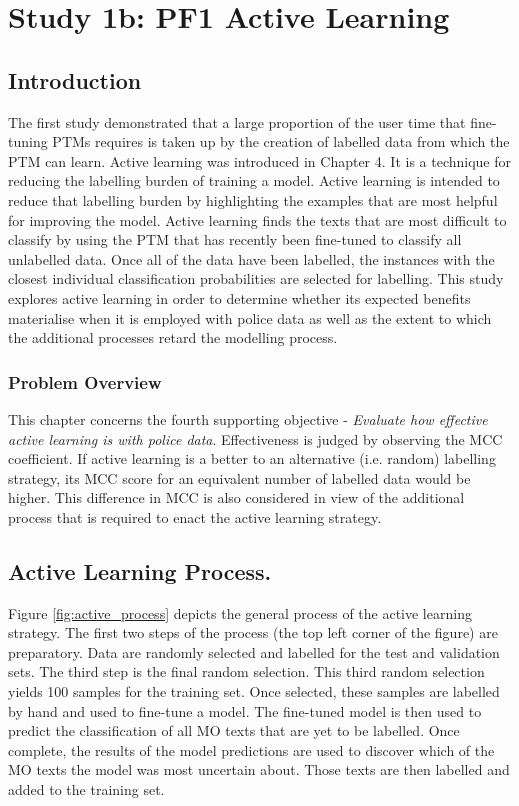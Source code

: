 \chapter{Study 1b: PF1 Active Learning}


\section{Introduction} The first study demonstrated that a large proportion of the user time that fine-tuning PTMs requires is taken up by the creation of labelled data from which the PTM can learn. Active learning was introduced in Chapter 4. It is a technique for reducing the labelling burden of training a model. Active learning is intended to reduce that labelling burden by highlighting the examples that are most helpful for improving the model. Active learning finds the texts that are most difficult to classify by using the PTM that has recently been fine-tuned to classify all unlabelled data. Once all of the data have been labelled, the instances with the closest individual classification probabilities are selected for labelling. This study explores active learning in order to determine whether its expected benefits materialise when it is employed with police data as well as the extent to which the additional processes retard the modelling process.

\subsection{Problem Overview}

This chapter concerns the fourth supporting objective - \emph{Evaluate how effective active learning is with police data}.  Effectiveness is judged by observing the MCC coefficient. If active learning is a better to an alternative (i.e. random) labelling strategy, its MCC score for an equivalent number of labelled data would be higher. This difference in MCC is also considered in view of the additional process that is required to enact the active learning strategy.

\section{Active Learning Process.} Figure \ref{fig:active_process} depicts the general process of the active learning strategy. The first two steps of the process (the top left corner of the figure) are preparatory. Data are randomly selected and labelled for the test and validation sets. The third step is the final random selection. This third random selection yields 100 samples for the training set. Once selected, these samples are labelled by hand and used to fine-tune a model. The fine-tuned model is then used to predict the classification of all MO texts that are yet to be labelled. Once complete, the results of the model predictions are used to discover which of the MO texts the model was most uncertain about. Those texts are then labelled and added to the training set.

